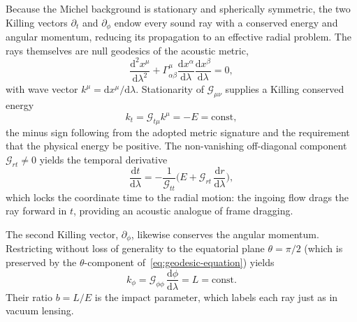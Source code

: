 \documentclass[12pt,a4paper,preprint]{elsarticle}
\begin{document}
            Because the Michel background is stationary and spherically symmetric, the two Killing vectors $\partial_{t}$ and $\partial_{\phi}$ endow every sound ray with a conserved energy and angular momentum, reducing its propagation to an effective radial problem. The rays themselves are null geodesics of the acoustic metric,
            \begin{equation}
                \frac{\mathrm{d}^{2}x^{\mu}}{\mathrm{d}\lambda^{2}} + \Gamma^{\mu}_{\alpha\beta} \frac{\mathrm{d}x^{\alpha}}{\mathrm{d}\lambda} \frac{\mathrm{d}x^{\beta}}{\mathrm{d}\lambda} = 0 ,
                \label{eq:geodesic-equation}
            \end{equation}
            with wave vector $k^{\mu}=\mathrm{d}x^{\mu}/\mathrm{d}\lambda$. Stationarity of $\mathcal{G}_{\mu\nu}$ supplies a Killing conserved energy
            \begin{equation}
                k_{t} = \mathcal{G}_{t\mu}k^{\mu} = -E = \mathrm{const} ,
                \label{eq:energy-conservation}
            \end{equation}
            the minus sign following from the adopted metric signature and the requirement that the physical energy be positive. The non-vanishing off-diagonal component $\mathcal{G}_{rt}\neq 0$ yields the temporal derivative
            \begin{equation}
                \frac{\mathrm{d}t}{\mathrm{d}\lambda} = -\frac{1}{\mathcal{G}_{tt}} \Biggl( E + \mathcal{G}_{rt}\,\frac{\mathrm{d}r}{\mathrm{d}\lambda} \Biggr) ,
                \label{eq:time-coordinate-derivative}
            \end{equation}
            which locks the coordinate time to the radial motion: the ingoing flow drags the ray forward in $t$, providing an acoustic analogue of frame dragging.

            The second Killing vector, $\partial_{\phi}$, likewise conserves the angular momentum. Restricting without loss of generality to the equatorial plane $\theta=\pi/2$ (which is preserved by the $\theta$-component of~\eqref{eq:geodesic-equation}) yields
            \begin{equation}
                k_{\phi} = \mathcal{G}_{\phi\phi}\,\frac{\mathrm{d}\phi}{\mathrm{d}\lambda} = L = \mathrm{const} .
                \label{eq:angular-momentum-conservation}
            \end{equation}
            Their ratio $b=L/E$ is the impact parameter, which labels each ray just as in vacuum lensing.
\end{document}
